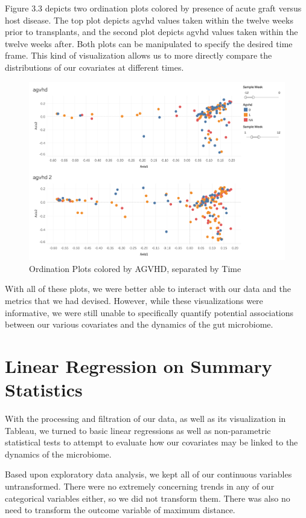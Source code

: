 \documentclass[12pt,twoside]{dukestatscithesis}
\begin{document}
Figure 3.3 depicts two ordination plots colored by presence of acute
graft versus host disease. The top plot depicts agvhd values taken
within the twelve weeks prior to transplants, and the second plot
depicts agvhd values taken within the twelve weeks after. Both plots can
be manipulated to specify the desired time frame. This kind of
visualization allows us to more directly compare the distributions of
our covariates at different times.
\begin{figure}
\includegraphics[width=700px]{figure/figure10} \caption{Ordination Plots colored by AGVHD, separated by Time}\label{fig:figure10}
\end{figure}
With all of these plots, we were better able to interact with our data
and the metrics that we had devised. However, while these visualizations
were informative, we were still unable to specifically quantify
potential associations between our various covariates and the dynamics
of the gut microbiome.

\chapter{Linear Regression on Summary
Statistics}\label{linear-regression-on-summary-statistics}

With the processing and filtration of our data, as well as its
visualization in Tableau, we turned to basic linear regressions as well
as non-parametric statistical tests to attempt to evaluate how our
covariates may be linked to the dynamics of the microbiome.

Based upon exploratory data analysis, we kept all of our continuous
variables untransformed. There were no extremely concerning trends in
any of our categorical variables either, so we did not transform them.
There was also no need to transform the outcome variable of maximum
distance.
\end{document}
